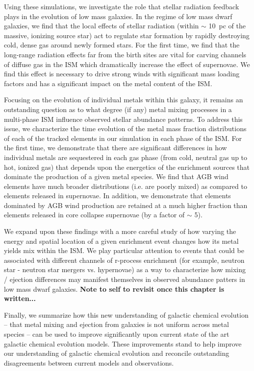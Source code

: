Using these simulations, we investigate the role that stellar radiation feedback plays in the evolution of low mass galaxies.
In the regime of low mass dwarf galaxies, we find that the local effects of stellar radiation (within $\sim$ 10~pc of the massive, ionizing source star) act to regulate star formation by rapidly destroying cold, dense gas around newly formed stars. For the first time, we find that the long-range radiation effects far from the birth sites are vital for carving channels of diffuse gas in the ISM which dramatically increase the effect of supernovae. We find this effect is necessary to drive strong winds with significant mass loading factors and has a significant impact on the metal content of the ISM.

Focusing on the evolution of individual metals within this galaxy, it remains an outstanding question as to what degree (if any) metal mixing processes in a multi-phase ISM influence observed stellar abundance patterns. To address this issue, we characterize the time evolution of the metal mass fraction distributions of each of the tracked elements in our simulation in each phase of the ISM. For the first time, we demonstrate that there are significant differences in how individual metals are sequestered in each gas phase (from cold, neutral gas up to hot, ionized gas) that depends upon the energetics of the enrichment sources that dominate the production of a given metal species. We find that AGB wind elements have much broader distributions (i.e. are poorly mixed) as compared to elements released in supernovae. In addition, we demonstrate that elements dominated by AGB wind production are retained at a much higher fraction than elements released in core collapse supernovae (by a factor of $\sim$ 5).

We expand upon these findings with a more careful study of how varying the energy and spatial location of a given enrichment event changes how its metal yields mix within the ISM. We play particular attention to events that could be associated with different channels of r-process enrichment (for example, neutron star - neutron star mergers vs. hypernovae) as a way to characterize how mixing / ejection differences may manifest themselves in observed abundance patters in low mass dwarf galaxies. \textbf{Note to self to revisit once this chapter is written...}

Finally, we summarize how this new understanding of galactic chemical evolution -- that metal mixing and ejection from galaxies is not uniform across metal species -- can be used to improve significantly upon current state of the art galactic chemical evolution models. These improvements stand to help improve our understanding of galactic chemical evolution and reconcile outstanding disagreements between current models and observations.
